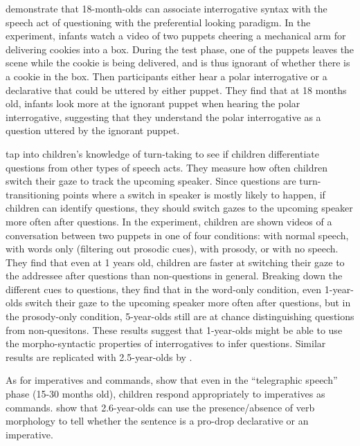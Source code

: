 \textcite{marshmallowqueen} demonstrate that 18-month-olds can associate interrogative syntax with the speech act of questioning with the preferential looking paradigm. In the experiment, infants watch a video of two puppets cheering a mechanical arm for delivering cookies into a box. During the test phase, one of the puppets leaves the scene while the cookie is being delivered, and is thus ignorant of whether there is a cookie in the box. Then participants either hear a polar interrogative  or a declarative  that could be uttered by either puppet. They find that at 18 months old, infants look more at the ignorant puppet when hearing the polar interrogative, suggesting that they understand the polar interrogative as a question uttered by the ignorant puppet.

\textcite{casillas2017turn} tap into children's knowledge of turn-taking to see if children differentiate questions from other types of speech acts. They measure how often children switch their gaze to track the upcoming speaker. Since questions are turn-transitioning points where a switch in speaker is mostly likely to happen, if children can identify questions, they should switch gazes to the upcoming speaker more often after questions. In the experiment, children are shown videos of a conversation between two puppets in one of four conditions: with normal speech, with words only (filtering out prosodic cues), with prosody, or with no speech. They find that even at 1 years old, children are faster at switching their gaze to the addressee after questions than non-questions in general. Breaking down the different cues to questions, they find that in the word-only condition, even 1-year-olds switch their gaze to the upcoming speaker more often after questions, but in the prosody-only condition, 5-year-olds still are at chance distinguishing questions from non-quesitons. These results suggest that 1-year-olds might be able to use the morpho-syntactic properties of interrogatives to infer questions. Similar results are replicated with 2.5-year-olds by \textcite{lammertink2015turn}.


As for imperatives and commands, \textcite{shipley1969} show that even in the ``telegraphic speech'' phase (15-30 months old), children respond appropriately to imperatives as commands. \textcite{orfitellihyams2012subj} show that 2.6-year-olds can use the presence/absence of verb morphology to tell whether the sentence is a pro-drop declarative or an imperative. 

